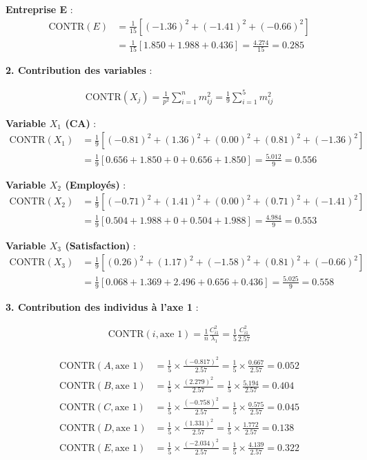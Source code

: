 \documentclass[11pt,a4paper]{article}
\begin{document}
\textbf{Entreprise E} :
\begin{align*}
\text{CONTR}(E) &= \frac{1}{15}[(-1.36)^2 + (-1.41)^2 + (-0.66)^2] \\
&= \frac{1}{15}[1.850 + 1.988 + 0.436] = \frac{4.274}{15} = 0.285
\end{align*}

\textbf{2. Contribution des variables} :

\begin{align*}
\text{CONTR}(X_j) = \frac{1}{p^2}\sum_{i=1}^{n} m_{ij}^2 = \frac{1}{9}\sum_{i=1}^{5} m_{ij}^2
\end{align*}

\textbf{Variable $X_1$ (CA)} :
\begin{align*}
\text{CONTR}(X_1) &= \frac{1}{9}[(-0.81)^2 + (1.36)^2 + (0.00)^2 + (0.81)^2 + (-1.36)^2] \\
&= \frac{1}{9}[0.656 + 1.850 + 0 + 0.656 + 1.850] = \frac{5.012}{9} = 0.556
\end{align*}

\textbf{Variable $X_2$ (Employés)} :
\begin{align*}
\text{CONTR}(X_2) &= \frac{1}{9}[(-0.71)^2 + (1.41)^2 + (0.00)^2 + (0.71)^2 + (-1.41)^2] \\
&= \frac{1}{9}[0.504 + 1.988 + 0 + 0.504 + 1.988] = \frac{4.984}{9} = 0.553
\end{align*}

\textbf{Variable $X_3$ (Satisfaction)} :
\begin{align*}
\text{CONTR}(X_3) &= \frac{1}{9}[(0.26)^2 + (1.17)^2 + (-1.58)^2 + (0.81)^2 + (-0.66)^2] \\
&= \frac{1}{9}[0.068 + 1.369 + 2.496 + 0.656 + 0.436] = \frac{5.025}{9} = 0.558
\end{align*}

\textbf{3. Contribution des individus à l'axe 1} :

\begin{align*}
\text{CONTR}(i, \text{axe } 1) = \frac{1}{n}\frac{C_{i1}^2}{\lambda_1} = \frac{1}{5}\frac{C_{i1}^2}{2.57}
\end{align*}

\begin{align*}
\text{CONTR}(A, \text{axe } 1) &= \frac{1}{5} \times \frac{(-0.817)^2}{2.57} = \frac{1}{5} \times \frac{0.667}{2.57} = 0.052 \\
\text{CONTR}(B, \text{axe } 1) &= \frac{1}{5} \times \frac{(2.279)^2}{2.57} = \frac{1}{5} \times \frac{5.194}{2.57} = 0.404 \\
\text{CONTR}(C, \text{axe } 1) &= \frac{1}{5} \times \frac{(-0.758)^2}{2.57} = \frac{1}{5} \times \frac{0.575}{2.57} = 0.045 \\
\text{CONTR}(D, \text{axe } 1) &= \frac{1}{5} \times \frac{(1.331)^2}{2.57} = \frac{1}{5} \times \frac{1.772}{2.57} = 0.138 \\
\text{CONTR}(E, \text{axe } 1) &= \frac{1}{5} \times \frac{(-2.034)^2}{2.57} = \frac{1}{5} \times \frac{4.139}{2.57} = 0.322
\end{align*}
\end{document}
